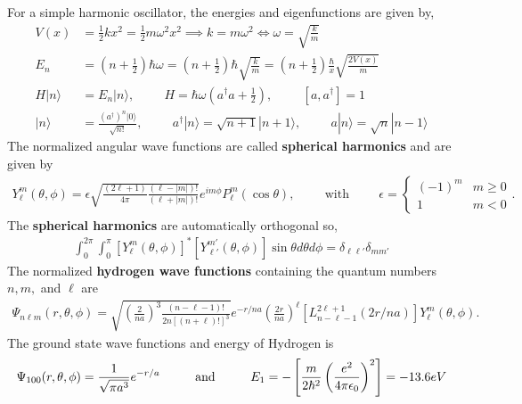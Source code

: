 For a simple harmonic oscillator, the energies and eigenfunctions are given by,
\begin{align}
	V(x)&=\frac{1}{2}kx^2=\frac{1}{2}m\omega^2x^2\implies k=m\omega^2 \Longleftrightarrow \omega=\sqrt{\frac{k}{m}} \\
	E_n&=\left(n+\frac{1}{2}\right)\hbar\omega=\left(n+\frac{1}{2}\right)\hbar\sqrt{\frac{k}{m}}=\left(n+\frac{1}{2}\right)\frac{\hbar}{x}\sqrt{\frac{2V(x)}{m}} \\
	H | n \rangle &= E_n |n \rangle, \hspace{1cm} H = \hbar \omega \left(a^\dagger a + \frac{1}{2}\right), \hspace{1cm}[a,a^\dagger]=1 \\	
	|n\rangle &= \frac{(a^\dagger)^n|0\rangle}{\sqrt{n!}}, \hspace{1cm} a^\dagger|n\rangle = \sqrt{n+1}|n+1\rangle, \hspace{1cm}a|n \rangle = \sqrt{n}|n-1\rangle
\end{align}
The normalized angular wave functions are called \textbf{spherical harmonics} and are given by
\begin{align}
	Y_\ell^m(\theta,\phi) = \epsilon\sqrt{\frac{(2\ell+1)}{4\pi}\frac{(\ell-|m|)!}{(\ell+|m|)!}}e^{im\phi}P_\ell^m(\cos\theta), \hspace{1cm} \textrm{with} \hspace{1cm}\epsilon = \begin{cases} (-1)^m & m \geq 0 \\ 1 & m < 0 \end{cases}.
\end{align}
The \textbf{spherical harmonics} are automatically orthogonal so,
\begin{align}
	\int_0^{2\pi}\int_0^\pi[Y_\ell^m(\theta,\phi)]^*[Y_{\ell'}^{m'}(\theta,\phi)]\sin\theta d\theta d\phi=\delta_{\ell \ell'}\delta_{m m'}
\end{align}
The normalized \textbf{hydrogen wave functions} containing the quantum numbers $n, m,$ and $\ell$ are
\begin{align}
	\Psi_{n\ell m}(r,\theta,\phi) = \sqrt{\left(\frac{2}{na}\right)^3\frac{(n-\ell-1)!}{2n[(n+\ell)!]^3}}e^{-r/na}\left(\frac{2r}{na}\right)^\ell\left[L_{n-\ell-1}^{2\ell+1}(2r/na)\right]Y_{\ell}^{m}(\theta,\phi).
\end{align}
The ground state wave functions and energy of Hydrogen is
\begin{align}
	\Psi_{100}(r,\theta,\phi) = \frac{1}{\sqrt{\pi a^3}}e^{-r/a} \andspace{1cm} E_1 = -\left[\frac{m}{2\hbar^2}\left(\frac{e^2}{4\pi\epsilon_0}\right)^2\right] = -13.6 eV
\end{align}
